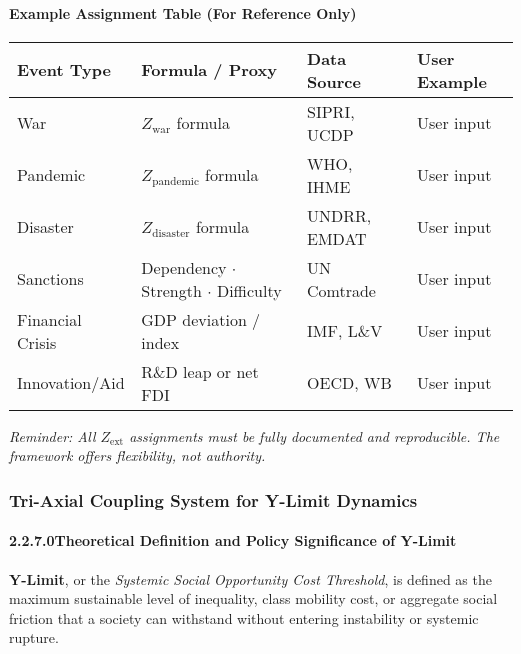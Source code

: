 \documentclass[12pt]{report}
\begin{document}
\paragraph{Example Assignment Table (For Reference Only)}
\begin{center}
\begin{tabular}{|l|l|l|l|}
\hline
\textbf{Event Type} & \textbf{Formula / Proxy} & \textbf{Data Source} & \textbf{User Example} \\
\hline
War & $Z_{\text{war}}$ formula & SIPRI, UCDP & User input \\
Pandemic & $Z_{\text{pandemic}}$ formula & WHO, IHME & User input \\
Disaster & $Z_{\text{disaster}}$ formula & UNDRR, EMDAT & User input \\
Sanctions & Dependency $\cdot$ Strength $\cdot$ Difficulty & UN Comtrade & User input \\
Financial Crisis & GDP deviation / index & IMF, L\&V & User input \\
Innovation/Aid & R\&D leap or net FDI & OECD, WB & User input \\
\hline
\end{tabular}
\end{center}

\vspace{0.5em}
\noindent
\textit{Reminder: All $Z_{\text{ext}}$ assignments must be fully documented and reproducible. The framework offers flexibility, not authority.}

\subsubsection{Tri-Axial Coupling System for Y-Limit Dynamics}

\paragraph{2.2.7.0\quad Theoretical Definition and Policy Significance of Y-Limit}

\textbf{Y-Limit}, or the \textit{Systemic Social Opportunity Cost Threshold}, is defined as the maximum sustainable level of inequality, class mobility cost, or aggregate social friction that a society can withstand without entering instability or systemic rupture.
\end{document}
